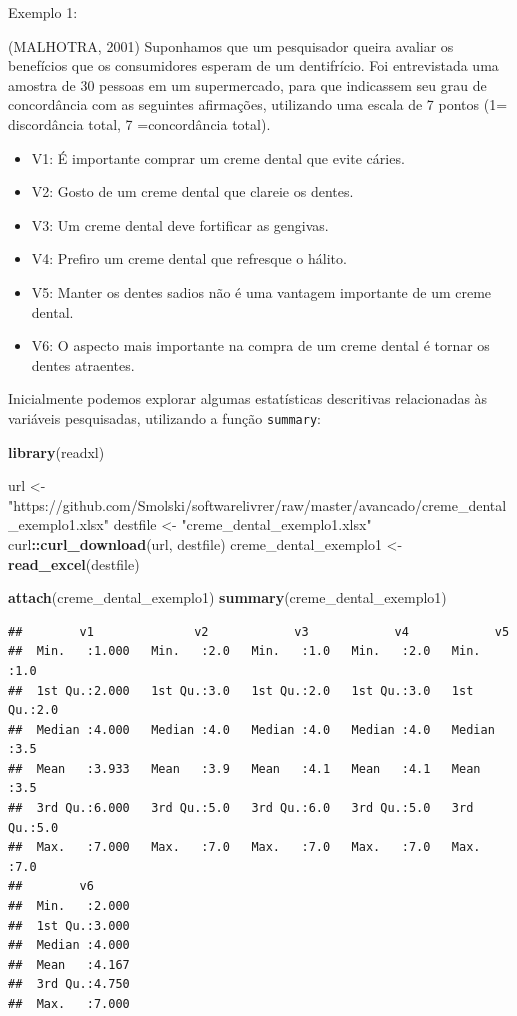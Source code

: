 \documentclass[12pt,brazil,]{book}
\newenvironment{Shaded}{\begin{snugshade}}{\end{snugshade}}
\newcommand{\KeywordTok}[1]{\textcolor[rgb]{0.13,0.29,0.53}{\textbf{#1}}}
\newcommand{\NormalTok}[1]{#1}
\newcommand{\OperatorTok}[1]{\textcolor[rgb]{0.81,0.36,0.00}{\textbf{#1}}}
\newcommand{\StringTok}[1]{\textcolor[rgb]{0.31,0.60,0.02}{#1}}
\providecommand{\tightlist}{%
  \setlength{\itemsep}{0pt}\setlength{\parskip}{0pt}}
\begin{document}
Exemplo 1:

(MALHOTRA, 2001) Suponhamos que um pesquisador queira avaliar os
benefícios que os consumidores esperam de um dentifrício. Foi
entrevistada uma amostra de 30 pessoas em um supermercado, para que
indicassem seu grau de concordância com as seguintes afirmações,
utilizando uma escala de 7 pontos (1= discordância total, 7
=concordância total).

\begin{itemize}
\tightlist
\item
  V1: É importante comprar um creme dental que evite cáries.
\item
  V2: Gosto de um creme dental que clareie os dentes.
\item
  V3: Um creme dental deve fortificar as gengivas.
\item
  V4: Prefiro um creme dental que refresque o hálito.
\item
  V5: Manter os dentes sadios não é uma vantagem importante de um creme
  dental.
\item
  V6: O aspecto mais importante na compra de um creme dental é tornar os
  dentes atraentes.
\end{itemize}

Inicialmente podemos explorar algumas estatísticas descritivas
relacionadas às variáveis pesquisadas, utilizando a função
\texttt{summary}:

\begin{Shaded}
\begin{Highlighting}[]
\KeywordTok{library}\NormalTok{(readxl)}

\NormalTok{url <-}\StringTok{ "https://github.com/Smolski/softwarelivrer/raw/master/avancado/creme_dental_exemplo1.xlsx"}
\NormalTok{destfile <-}\StringTok{ "creme_dental_exemplo1.xlsx"}
\NormalTok{curl}\OperatorTok{::}\KeywordTok{curl_download}\NormalTok{(url, destfile)}
\NormalTok{creme_dental_exemplo1 <-}\StringTok{ }\KeywordTok{read_excel}\NormalTok{(destfile)}

\KeywordTok{attach}\NormalTok{(creme_dental_exemplo1)}
\KeywordTok{summary}\NormalTok{(creme_dental_exemplo1)}
\end{Highlighting}
\end{Shaded}

\begin{verbatim}
##        v1              v2            v3            v4            v5     
##  Min.   :1.000   Min.   :2.0   Min.   :1.0   Min.   :2.0   Min.   :1.0  
##  1st Qu.:2.000   1st Qu.:3.0   1st Qu.:2.0   1st Qu.:3.0   1st Qu.:2.0  
##  Median :4.000   Median :4.0   Median :4.0   Median :4.0   Median :3.5  
##  Mean   :3.933   Mean   :3.9   Mean   :4.1   Mean   :4.1   Mean   :3.5  
##  3rd Qu.:6.000   3rd Qu.:5.0   3rd Qu.:6.0   3rd Qu.:5.0   3rd Qu.:5.0  
##  Max.   :7.000   Max.   :7.0   Max.   :7.0   Max.   :7.0   Max.   :7.0  
##        v6       
##  Min.   :2.000  
##  1st Qu.:3.000  
##  Median :4.000  
##  Mean   :4.167  
##  3rd Qu.:4.750  
##  Max.   :7.000
\end{verbatim}
\end{document}
